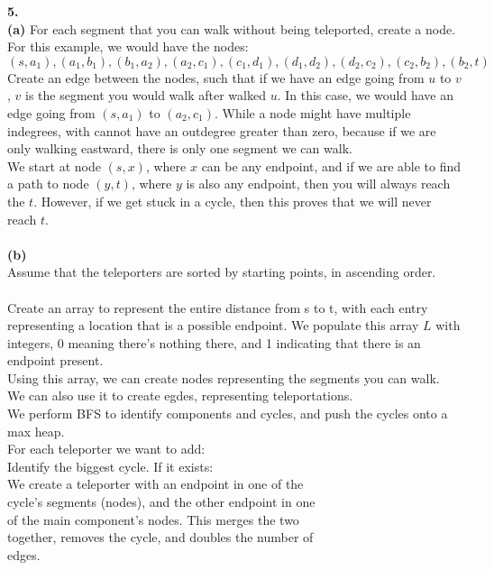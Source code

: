 \documentclass[10pt, letterpaper]{report}
\newcommand\tab[1][1cm]{\hspace*{#1}}
\begin{document}
\newpage
\noindent \large{\textbf{5.} } \\
\textbf{(a)} For each segment that you can walk without being teleported, create a node. For this example, we would have the nodes:
\[(s, a_1), (a_1, b_1), (b_1, a_2), (a_2, c_1), (c_1, d_1), (d_1, d_2), (d_2, c_2), (c_2, b_2), (b_2, t)\]
Create an edge between the nodes, such that if we have an edge going from $u$ to $v$, $v$ is the segment you would walk after walked $u$. In this case, we would have an edge going from $(s, a_1)$ to $(a_2, c_1)$. While a node might have multiple indegrees, with cannot have an outdegree greater than zero, because if we are only walking eastward, there is only one segment we can walk.\\
We start at node $(s, x)$, where $x$ can be any endpoint, and if we are able to find a path to node $(y, t)$, where $y$ is also any endpoint, then you will always reach the $t$. However, if we get stuck in a cycle, then this proves that we will never reach $t$. \\
\\
\textbf{(b)} \\
Assume that the teleporters are sorted by starting points, in ascending order.  \\
\\
Create an array to represent the entire distance from s to t, with each entry representing a location that is a possible endpoint. We populate this array $L$ with integers, 0 meaning there's nothing there, and 1 indicating that there is an endpoint present.\\
Using this array, we can create nodes representing the segments you can walk.\\
We can also use it to create egdes, representing teleportations. \\
We perform BFS to identify components and cycles, and push the cycles onto a max heap.\\
For each teleporter we want to add:\\
\tab Identify the biggest cycle. If it exists:\\
\tab\tab We create a teleporter with an endpoint in one of the\\
\tab\tab cycle's segments (nodes), and the other endpoint in one\\
\tab\tab of the main component's nodes. This merges the two\\
\tab\tab together, removes the cycle, and doubles the number of\\
\tab\tab edges.\\
\end{document}
